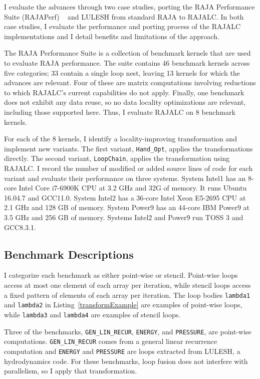 I evaluate the advances through two case studies, porting the RAJA
Performance Suite (RAJAPerf) ~\cite{hornung2017raja} and  LULESH from
standard RAJA to RAJALC.
In both case studies, I evaluate the performance and porting process
of the RAJALC implementations and I detail benefits and limitations
of the approach.

The RAJA Performance Suite is a collection of benchmark kernels that are
used to evaluate RAJA performance.
The suite contains 46 benchmark kernels across five categories; 33 contain
a single loop nest, leaving 13 kernels for which the advances are relevant.
Four of these are matrix computations involving reductions to which 
RAJALC's current capabilities do not apply. 
Finally, one benchmark does not exhibit any data reuse, so no data locality 
optimizations are relevant, including those supported here. 
Thus, I evaluate RAJALC on 8 benchmark kernels.

For each of the 8 kernels, I identify a locality-improving transformation
and implement new variants.
The first variant, \verb.Hand_Opt., applies the transformations directly.
The second variant, \verb.LoopChain., applies the transformation using RAJALC.
I record the number of modified or added source lines of code for each
variant and evaluate their performance on three systems.
System Intel1 has an 8-core Intel Core i7-6900K CPU at 3.2 GHz and 32G of memory.
It runs Ubuntu 16.04.7 and GCC11.0.
System Intel2 has a 36-core Intel Xeon E5-2695 CPU at 2.1 GHz and 128 GB of memory.
System Power9 has an 44-core IBM Power9 at 3.5 GHz and 256 GB of memory.
Systems Intel2 and Power9 run TOSS 3 and GCC8.3.1.


\subsection{Benchmark Descriptions}

I categorize each benchmark as either point-wise or stencil. 
Point-wise loops access at most one element of each array per iteration,
while stencil loops access a fixed pattern of elements of each array per
iteration. 
The loop bodies
\verb.lambda1. and \verb.lambda2. in Listing~\ref{transformExample} are
examples of point-wise loops, while \verb.lambda3. and \verb.lambda4. are
examples of stencil loops.

Three of the benchmarks, \verb.GEN_LIN_RECUR., \verb.ENERGY., and
\verb.PRESSURE., are point-wise computations.
\verb.GEN_LIN_RECUR. comes from a general linear recurrence computation and
\verb.ENERGY. and \verb.PRESSURE. are loops extracted from LULESH, a
hydrodynamics code. 
For these benchmarks, loop fusion does not interfere with parallelism, so
I apply that transformation.

